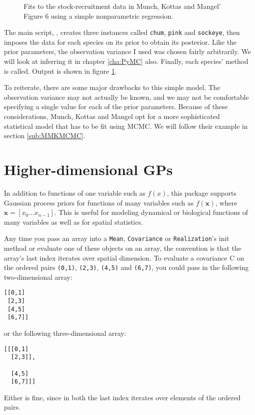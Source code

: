 \begin{figure}
    \centering
    \caption{Fits to the stock-recruitment data in Munch, Kottas and Mangel' \cite{mmk} Figure 6 using a simple nonparametric regression.}
    \label{fig:MMKregression}
\end{figure}

The main script, , creates three  instances called \texttt{chum}, \texttt{pink} and \texttt{sockeye}, then imposes the data for each species on its prior to obtain its posterior. Like the prior parameters, the observation variance I used was chosen fairly arbitrarily. We will look at inferring it in chapter \ref{cha:PyMC} also. Finally, each species'  method is called. Output is shown in figure \ref{fig:MMKregression}.
% 

To reiterate, there are some major drawbacks to this simple model. The observation variance may not actually be known, and we may not be comfortable specifying a single value for each of the prior parameters. Because of these considerations, Munch, Kottas and Mangel opt for a more sophisticated statistical model that has to be fit using MCMC. We will follow their example in section \ref{sub:MMKMCMC}.

\section{Higher-dimensional GPs}\label{sec:highdim}

In addition to functions of one variable such as $f(x)$, this package supports Gaussian process priors for functions of many variables such as $f(\mathbf{x})$, where $\mathbf{x}=[x_0\ldots x_{n-1}]$. This is useful for modeling dynamical or biological functions of many variables as well as for spatial statistics.

Any time you pass an array into a \texttt{Mean}, \texttt{Covariance} or \texttt{Realization}'s init method or evaluate one of these objects on an array, the convention is that the array's last index iterates over spatial dimension. To evaluate a covariance C on the ordered pairs \texttt{(0,1)}, \texttt{(2,3)}, \texttt{(4,5)} and \texttt{(6,7)}, you could pass in the following two-dimensional array:
\begin{verbatim}
[[0,1]
 [2,3]
 [4,5]
 [6,7]]
\end{verbatim}
or the following three-dimensional array:
\begin{verbatim}
[[[0,1]
  [2,3]],

  [4,5]
  [6,7]]]
\end{verbatim}
Either is fine, since in both the last index iterates over elements of the ordered pairs.

